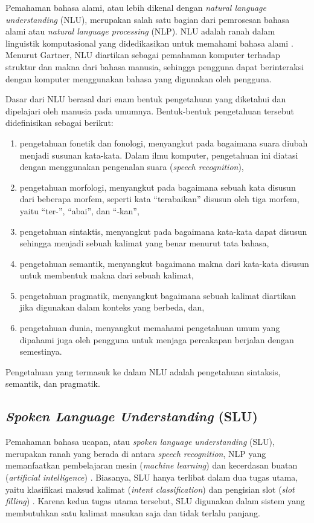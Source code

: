 Pemahaman bahasa alami, atau lebih dikenal dengan \textit{natural language understanding} (NLU), merupakan salah satu bagian dari pemrosesan bahasa alami atau \textit{natural language processing} (NLP). NLU adalah ranah dalam linguistik komputasional yang didedikasikan untuk memahami bahasa alami \parencite{harris2004voice}. Menurut Gartner, NLU diartikan sebagai pemahaman komputer terhadap struktur dan makna dari bahasa manusia, sehingga pengguna dapat berinteraksi dengan komputer menggunakan bahasa yang digunakan oleh pengguna.

Dasar dari NLU berasal dari enam bentuk pengetahuan yang diketahui dan dipelajari oleh manusia pada umumnya. Bentuk-bentuk pengetahuan tersebut didefinisikan sebagai berikut: \parencite{allen1995natural}

\begin{enumerate}
	\item pengetahuan fonetik dan fonologi, menyangkut pada bagaimana suara diubah menjadi susunan kata-kata. Dalam ilmu komputer, pengetahuan ini diatasi dengan menggunakan pengenalan suara (\textit{speech recognition}),
	\item pengetahuan morfologi, menyangkut pada bagaimana sebuah kata disusun dari beberapa morfem, seperti kata “terabaikan” disusun oleh tiga morfem, yaitu “ter-”, “abai”, dan “-kan”,
	\item pengetahuan sintaktis, menyangkut pada bagaimana kata-kata dapat disusun sehingga menjadi sebuah kalimat yang benar menurut tata bahasa,
	\item pengetahuan semantik, menyangkut bagaimana makna dari kata-kata disusun untuk membentuk makna dari sebuah kalimat,
	\item pengetahuan pragmatik, menyangkut bagaimana sebuah kalimat diartikan jika digunakan dalam konteks yang berbeda, dan,
	\item pengetahuan dunia, menyangkut memahami pengetahuan umum yang dipahami juga oleh pengguna untuk menjaga percakapan berjalan dengan semestinya.
\end{enumerate}

Pengetahuan yang termasuk ke dalam NLU adalah pengetahuan sintaksis, semantik, dan pragmatik.

\subsection{\textit{Spoken Language Understanding} (SLU)}

Pemahaman bahasa ucapan, atau \textit{spoken language understanding} (SLU), merupakan ranah yang berada di antara \textit{speech recognition}, NLP yang memanfaatkan pembelajaran mesin (\textit{machine learning}) dan kecerdasan buatan (\textit{artificial intelligence}) \parencite{tur2011spoken}. Biasanya, SLU hanya terlibat dalam dua tugas utama, yaitu klasifikasi maksud kalimat (\textit{intent classification}) dan pengisian slot (\textit{slot filling}) \parencite{goo2018slot}. Karena kedua tugas utama tersebut, SLU digunakan dalam sistem yang membutuhkan satu kalimat masukan saja dan tidak terlalu panjang.

